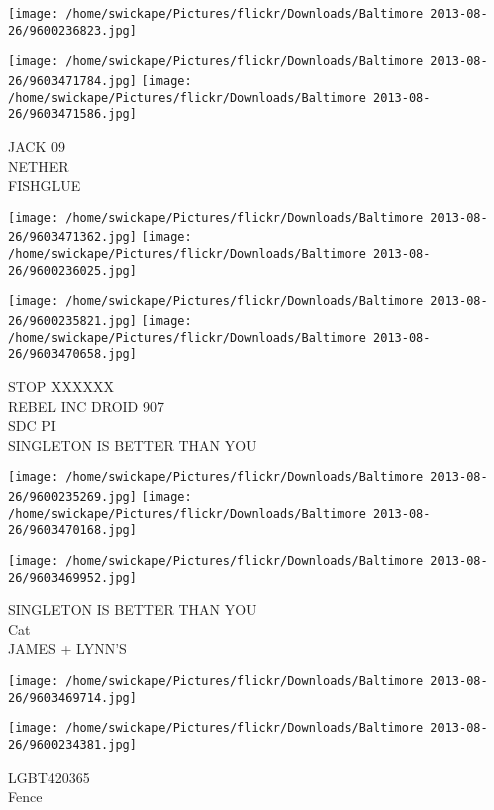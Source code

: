 \documentclass[10pt,letterpaper]{article}
\begin{document}
\texttt{[image: /home/swickape/Pictures/flickr/Downloads/Baltimore 2013-08-26/9600236823.jpg]}

\vspace{0.25in}
\texttt{[image: /home/swickape/Pictures/flickr/Downloads/Baltimore 2013-08-26/9603471784.jpg]}
\texttt{[image: /home/swickape/Pictures/flickr/Downloads/Baltimore 2013-08-26/9603471586.jpg]}

JACK 09\\
NETHER\\
FISHGLUE\\
\pagebreak

\texttt{[image: /home/swickape/Pictures/flickr/Downloads/Baltimore 2013-08-26/9603471362.jpg]}
\texttt{[image: /home/swickape/Pictures/flickr/Downloads/Baltimore 2013-08-26/9600236025.jpg]}

\texttt{[image: /home/swickape/Pictures/flickr/Downloads/Baltimore 2013-08-26/9600235821.jpg]}
\texttt{[image: /home/swickape/Pictures/flickr/Downloads/Baltimore 2013-08-26/9603470658.jpg]}

STOP XXXXXX\\
REBEL INC DROID 907\\
SDC PI\\
SINGLETON IS BETTER THAN YOU\\
\pagebreak

\texttt{[image: /home/swickape/Pictures/flickr/Downloads/Baltimore 2013-08-26/9600235269.jpg]}
\texttt{[image: /home/swickape/Pictures/flickr/Downloads/Baltimore 2013-08-26/9603470168.jpg]}

\texttt{[image: /home/swickape/Pictures/flickr/Downloads/Baltimore 2013-08-26/9603469952.jpg]}

SINGLETON IS BETTER THAN YOU\\
Cat\\
JAMES + LYNN'S\\
\pagebreak

\texttt{[image: /home/swickape/Pictures/flickr/Downloads/Baltimore 2013-08-26/9603469714.jpg]}

\vspace{0.25in}
\texttt{[image: /home/swickape/Pictures/flickr/Downloads/Baltimore 2013-08-26/9600234381.jpg]}

LGBT420365\\
Fence\\
\pagebreak
\end{document}
